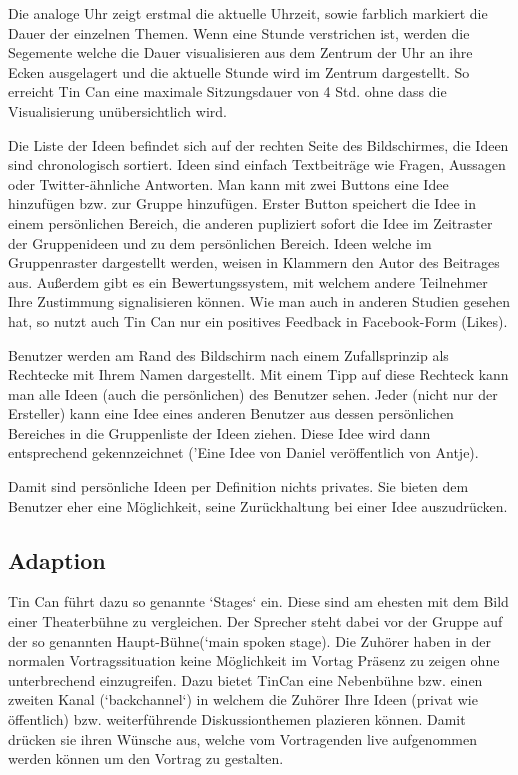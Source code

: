 Die analoge Uhr zeigt erstmal die aktuelle Uhrzeit, sowie farblich markiert die
Dauer der einzelnen Themen.
Wenn eine Stunde verstrichen ist, werden die Segemente welche die Dauer
visualisieren aus dem Zentrum der Uhr an ihre Ecken ausgelagert und die aktuelle
Stunde wird im Zentrum dargestellt. So erreicht Tin Can eine maximale
Sitzungsdauer von 4 Std. ohne dass die Visualisierung unübersichtlich wird.

Die Liste der Ideen befindet sich auf der rechten Seite des Bildschirmes, die
Ideen sind chronologisch sortiert. Ideen sind einfach Textbeiträge wie Fragen,
Aussagen oder Twitter-ähnliche Antworten. Man kann mit zwei Buttons eine Idee
hinzufügen bzw. zur Gruppe hinzufügen. Erster Button speichert die Idee in einem
persönlichen Bereich, die anderen pupliziert sofort die Idee im Zeitraster der
Gruppenideen und zu dem persönlichen Bereich. Ideen welche im Gruppenraster
dargestellt werden, weisen in Klammern den Autor des Beitrages aus. Außerdem
gibt es ein Bewertungssystem, mit welchem andere Teilnehmer Ihre Zustimmung
signalisieren können. Wie man auch in anderen Studien gesehen hat, so nutzt auch
Tin Can nur ein positives Feedback in Facebook-Form (Likes).

Benutzer werden am Rand des Bildschirm nach einem Zufallsprinzip als Rechtecke
mit Ihrem Namen dargestellt. Mit einem Tipp auf diese Rechteck kann man alle
Ideen (auch die persönlichen) des Benutzer sehen. Jeder (nicht nur der
Ersteller) kann eine Idee eines anderen Benutzer aus dessen persönlichen
Bereiches in die Gruppenliste der Ideen ziehen. Diese Idee wird dann
entsprechend gekennzeichnet ('Eine Idee von Daniel veröffentlich von Antje).

Damit sind persönliche Ideen per Definition nichts privates. Sie bieten dem
Benutzer eher eine Möglichkeit, seine Zurückhaltung bei einer Idee auszudrücken.

\subsection{Adaption}
Tin Can führt dazu so genannte `Stages` ein. Diese sind am ehesten mit dem Bild
einer Theaterbühne zu vergleichen. Der Sprecher steht dabei vor der Gruppe auf
der so genannten Haupt-Bühne(`main spoken stage). Die Zuhörer haben in der
normalen Vortragssituation keine Möglichkeit im Vortag Präsenz zu zeigen ohne
unterbrechend einzugreifen. Dazu bietet TinCan eine Nebenbühne bzw. einen
zweiten Kanal (`backchannel`) in welchem die Zuhörer Ihre Ideen (privat wie
öffentlich) bzw. wei\-ter\-führ\-en\-de Dis\-kus\-sion\-themen plazieren können.
Damit drücken sie ihren Wünsche aus, welche vom Vortragenden live aufgenommen
werden können um den Vortrag zu gestalten.


